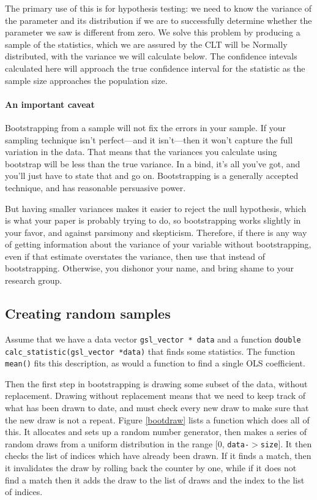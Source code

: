 The primary use of this is for hypothesis testing: we need to know the
variance of the parameter and its distribution if we are to successfully
determine whether the parameter we saw is different from zero. We
solve this problem by producing a sample of the statistics, which we
are assured by the CLT will be Normally distributed, with the variance
we will calculate below. The confidence intevals calculated here will
approach the true confidence interval for the statistic
as the sample size approaches the population size.

\paragraph{An important caveat} Bootstrapping from a sample will not fix
the errors in your sample. If your sampling technique isn't perfect---and
it isn't---then it won't capture the full variation in the data. That
means that the variances you calculate using bootstrap will be less than
the true variance. In a bind, it's all you've got, and you'll just have
to state that and go on. Bootstrapping is a generally accepted technique,
and has reasonable persuasive power.

But having smaller variances makes
it easier to reject the null hypothesis, which is what your paper is
probably trying to do, so bootstrapping works slightly in your favor,
and against parsimony and skepticism. Therefore, if there is any way
of getting information about the variance of your variable without
bootstrapping, even if that estimate overstates the variance, then use
that instead of bootstrapping. Otherwise, you dishonor your name, and
bring shame to your research group.


\subsection{Creating random samples} Assume that we have a
data vector {\tt gsl\_vector * data} and a function {\tt double
calc\_\-stat\-istic(gsl\_\-vec\-tor *data)} that finds some statistics. The
function {\tt mean()} fits this description, as would a function to find
a single OLS coefficient.

Then the first step in bootstrapping is drawing some subset of the data,
without replacement. Drawing without replacement means that we need to
keep track of what has been drawn to date, and must check every new draw
to make sure that the new draw is not a repeat. Figure \ref{bootdraw} lists a function which
does all of this. It allocates and sets up a random number generator, then
makes a series of random draws from a uniform distribution in the range
[0, {\tt data-$>$size}]. It then checks the list of indices which have
already been drawn. If it finds a match, then it invalidates the draw
by rolling back the counter by one, while if it does not find a match then it
adds the draw to the list of draws and the index to the list of indices.

